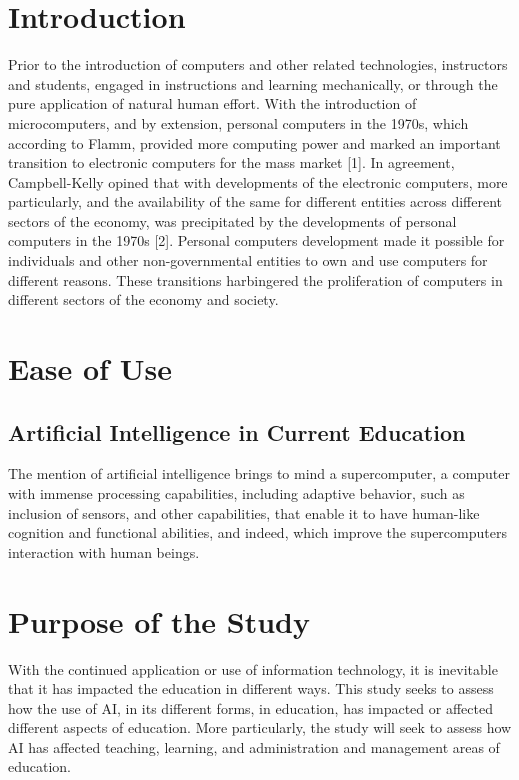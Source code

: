 \documentclass[conference]{IEEEtran}
\begin{document}
\section{Introduction}
Prior to the introduction of computers and other related technologies, instructors and students, engaged in instructions and learning mechanically, or through the pure application of natural human effort. With the introduction of microcomputers, and by extension, personal computers in the 1970s, which according to Flamm, provided more computing power and marked an important transition to electronic computers for the mass market [1]. In agreement, Campbell-Kelly opined that with developments of the electronic computers, more particularly, and the availability of the same for different entities across different sectors of the economy, was precipitated by the developments of personal computers in the 1970s [2]. Personal computers development made it possible for individuals and other non-governmental entities to own and use computers for different reasons. These transitions harbingered the proliferation of computers in different sectors of the economy and society.

\section{Ease of Use}

\subsection{Artificial Intelligence in Current Education}
The mention of artificial intelligence brings to mind a supercomputer, a computer with immense processing capabilities, including adaptive behavior, such as inclusion of sensors, and other capabilities, that enable it to have human-like cognition and functional abilities, and indeed, which improve the supercomputers interaction with human beings.
\section{Purpose of the Study}
With the continued application or use of information technology, it is inevitable that it has impacted the education in different ways. This study seeks to assess how the use of AI, in its different forms, in education, has impacted or affected different aspects of education. More particularly, the study will seek to assess how AI has affected teaching, learning, and administration and management areas of education.
\end{document}
